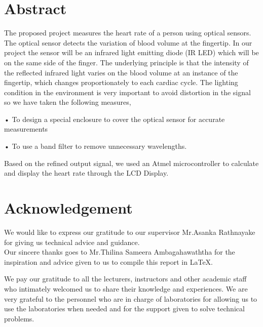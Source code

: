 \documentclass[12pt]{article}
\begin{document}
\begin{titlepage}
	\vfill
	
\end{titlepage}

\newpage
\section{Abstract}
The proposed project measures the heart rate of a person using optical sensors. 
The optical sensor detects the variation of blood volume at the fingertip.
In our project the sensor will be an infrared light emitting diode (IR LED) which will be on the same side of the finger.
The underlying principle is that the intensity of the reflected infrared light varies on the blood volume at an instance of the fingertip, which changes proportionately to each cardiac cycle. 
The lighting condition in the environment is very important to avoid distortion in the signal so we have taken the following measures,

• To design a special enclosure to cover the optical sensor for accurate measurements

• To use a band filter to remove unnecessary wavelengths.

Based on the refined output signal, we used an Atmel microcontroller to calculate and display the heart rate through the LCD Display.

\section{Acknowledgement}
We would like to express our gratitude to our supervisor Mr.Asanka Rathnayake for giving us technical advice and guidance.\\
Our sincere thanks goes to Mr.Thilina Sameera Ambagahawaththa for the inspiration and advice given to us to compile this report in LaTeX.

We pay our gratitude to all the lecturers, instructors and other academic staff who intimately welcomed us to share their knowledge and experiences. We are very grateful to the personnel who are in charge of laboratories for allowing us to use the laboratories when needed and for the support given to solve technical problems.

\newpage
\tableofcontents
\pagebreak


\end{document}
